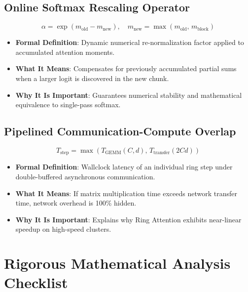 \documentclass[11pt,a4paper]{article}
\theoremstyle{definition}
\begin{document}
\subsection{Online Softmax Rescaling Operator}
{\boldmath
\begin{equation}
\alpha = \exp\left( m_{\text{old}} - m_{\text{new}} \right), \quad m_{\text{new}} = \max(m_{\text{old}}, \, m_{\text{block}})
\end{equation}
}
\begin{itemize}
    \item \textbf{Formal Definition}: Dynamic numerical re-normalization factor applied to accumulated attention moments.
    \item \textbf{What It Means}: Compensates for previously accumulated partial sums when a larger logit is discovered in the new chunk.
    \item \textbf{Why It Is Important}: Guarantees numerical stability and mathematical equivalence to single-pass softmax.
\end{itemize}

\subsection{Pipelined Communication-Compute Overlap}
{\boldmath
\begin{equation}
T_{\text{step}} = \max\left( T_{\text{GEMM}}(C, d), \, T_{\text{transfer}}(2 C d) \right)
\end{equation}
}
\begin{itemize}
    \item \textbf{Formal Definition}: Wallclock latency of an individual ring step under double-buffered asynchronous communication.
    \item \textbf{What It Means}: If matrix multiplication time exceeds network transfer time, network overhead is 100\% hidden.
    \item \textbf{Why It Is Important}: Explains why Ring Attention exhibits near-linear speedup on high-speed clusters.
\end{itemize}

\section{Rigorous Mathematical Analysis Checklist}
\end{document}
